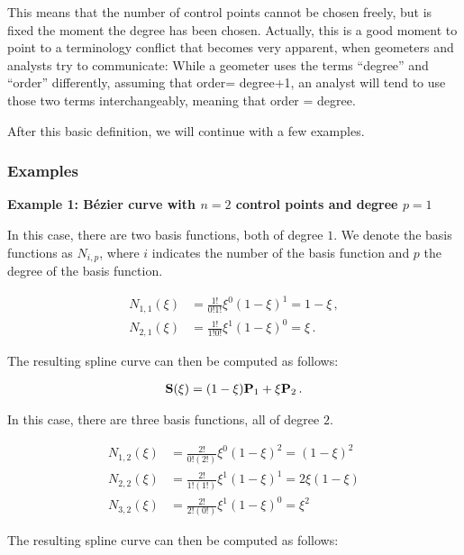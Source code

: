 \documentclass[11pt,a4paper]{article}
\begin{document}
This means that the number of control points cannot be chosen freely, but is fixed the moment the degree has been chosen. Actually, this is a good moment to point to a terminology conflict that becomes very apparent, when geometers and analysts try to communicate: While a geometer uses the terms ``degree'' and ``order'' differently, assuming that order= degree+1, an analyst will tend to use those two terms interchangeably, meaning that order = degree.

After this basic definition, we will continue with a few examples.




\subsubsection{Examples}

{\bf{Example 1: Bézier curve with $n=2$ control points and degree $p=1$}}

 In this case, there are two basis functions, both of degree $1$. We denote the basis functions as $N_{i,p}$, where $i$ indicates the number of the basis function and $p$ the degree of the basis function.

	\begin{align}
		N_{1,1}(\xi)&=\frac{1!}{0!1!}\xi^{0}(1-\xi)^{1}=1-\xi \,,\\
		N_{2,1}(\xi)&=\frac{1!}{1!0!}\xi^{1}(1-\xi)^{0}=\xi \,.
	\end{align}

\noindent The resulting spline curve can then be computed as follows:

\begin{align}
	{\bf S}(\xi)=(1-\xi){\bf P}_{1}+\xi {\bf P}_{2} \,.
\end{align}



\noindent In this case, there are three basis functions, all of degree $2$.

	\begin{align*}
		N_{1,2}(\xi)&=\frac{2!}{0!(2!)}\xi^{0}(1-\xi)^{2}=(1-\xi)^{2} \\
		N_{2,2}(\xi)&=\frac{2!}{1!(1!)}\xi^{1}(1-\xi)^{1}=2\xi (1-\xi) \\
		N_{3,2}(\xi)&=\frac{2!}{2!(0!)}\xi^{1}(1-\xi)^{0}=\xi^{2}
	\end{align*}

\noindent The resulting spline curve can then be computed as follows:
\end{document}
